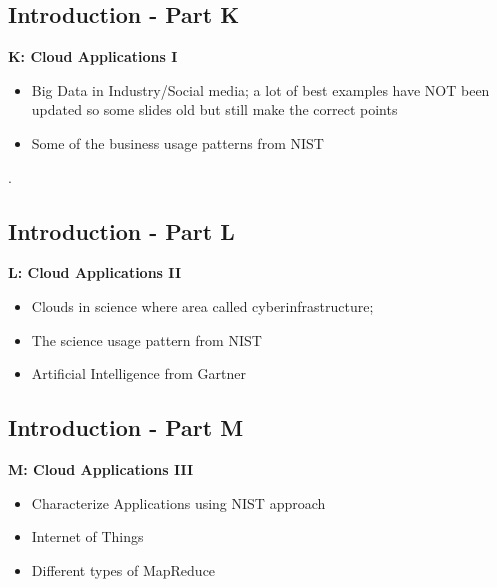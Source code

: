 \subsection{Introduction - Part K}\label{s:cloud-fundamentals-k}

\textbf{K: Cloud Applications I}
\begin{itemize}
\item Big Data in Industry/Social media; a lot of best examples have
  NOT been updated so some slides old but still make the correct
  points
\item Some of the business usage patterns from NIST

\end{itemize}. 

\subsection{Introduction - Part L}\label{s:cloud-fundamentals-l}

\textbf{L: Cloud Applications II}
\begin{itemize}
\item Clouds in science where area called cyberinfrastructure;
\item The science usage pattern from NIST
\item Artificial Intelligence from Gartner
\end{itemize}

\subsection{Introduction - Part M}\label{s:cloud-fundamentals-m}

\textbf{M: Cloud Applications III}
\begin{itemize}
\item Characterize Applications using NIST approach
\item Internet of Things
\item Different types of MapReduce
\end{itemize}

